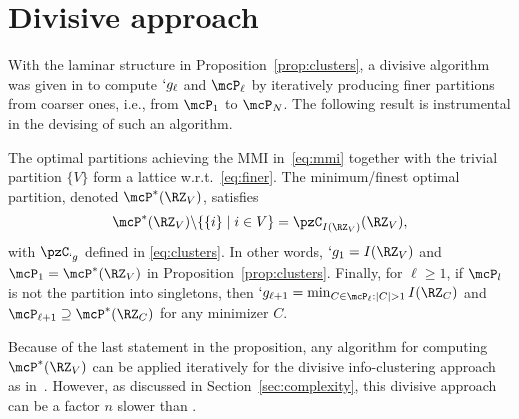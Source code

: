 \section{Divisive approach}
With the laminar structure in Proposition~\ref{prop:clusters}, a divisive algorithm was given in \cite{chan16cluster} to
compute $`g_\ell$ and $\mcP_{\ell}$ by iteratively producing finer partitions from coarser ones,
i.e., from $\mcP_1$ to $\mcP_N$. 
The following result is instrumental in the devising of such an algorithm.
%
\begin{Proposition}
	\label{prop:fund:cluster}
	The optimal partitions achieving the MMI in~\eqref{eq:mmi} together with the trivial partition $\{V\}$ form a
	lattice w.r.t.\ \eqref{eq:finer}. The minimum/finest optimal partition, denoted 
	$\mcP^{*}(\RZ_V)$, satisfies 
	\begin{align*}
		\mcP^{*}(\RZ_V) \backslash \{\{i\}\mid i\in V\} = \pzC_{I(\RZ_V)}(\RZ_V),
	\end{align*}
	with $\pzC_{`g}$ defined in \eqref{eq:clusters}.
	In other words,  $`g_1 = I(\RZ_V)$ and $\mcP_{1} = \mcP^{*}(\RZ_V)$ in
	Proposition~\ref{prop:clusters}. Finally, for $\ell \geq 1$,
	if $\mcP_l$ is not the partition into singletons,
	then $`g_{\ell +1} = \min\nolimits_{C\in \mcP_{\ell}:\abs{C}> 1}I(\RZ_C)$ and
	$\mcP_{\ell+1}\supseteq \mcP^*(\RZ_C)$ for any minimizer $C$.
\end{Proposition}
Because of the last statement in the proposition, any algorithm for computing $\mcP^{*}(\RZ_V)$ can
be applied iteratively for the divisive info-clustering approach as in~\cite[Algorithm~2]{chan16cluster}.
However,
as discussed in Section~\ref{sec:complexity},
this divisive approach can be a factor $n$ slower than \cite[Algorithm~3]{chan16cluster}.

